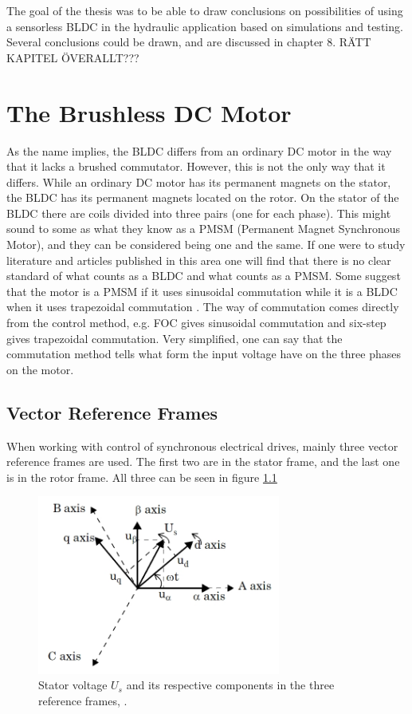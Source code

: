 \documentclass{LTHthesis}
\begin{document}
The goal of the thesis was to be able to draw conclusions on possibilities of using a sensorless BLDC in the hydraulic application based on simulations and testing. Several conclusions could be drawn, and are discussed in chapter 8.
RÄTT KAPITEL ÖVERALLT???


\chapter{The Brushless DC Motor}
As the name implies, the BLDC differs from an ordinary DC motor in the way that it lacks a brushed commutator. However, this is not the only way that it differs. 
While an ordinary DC motor has its permanent magnets on the stator, the BLDC has its permanent magnets located on the rotor. On the stator of the BLDC there are coils divided into three pairs (one for each phase). This might sound to some as what they know as a PMSM (Permanent Magnet Synchronous Motor), and they can be considered being one and the same. If one were to study literature and articles published in this area one will find that there is no clear standard of what counts as a BLDC and what counts as a PMSM. Some suggest that the motor is a PMSM if it uses sinusoidal commutation while it is a BLDC when it uses trapezoidal commutation \cite{lee_lem_keo}. The way of commutation comes directly from the control method, e.g. FOC gives sinusoidal commutation and six-step gives trapezoidal commutation. Very simplified, one can say that the commutation method tells what form the input voltage have on the three phases on the motor. 

\section{Vector Reference Frames}
When working with control of synchronous electrical drives, mainly three vector reference frames are used. The first two are in the stator frame, and the last one is in the rotor frame. All three can be seen in figure \ref{ref_frames}
\begin{figure}
\centering
\includegraphics[width=8cm]{ref_frames_mathworks}
\caption{Stator voltage $U_{s}$ and its respective components in the three reference frames, \cite{ref_frames}.}
\label{ref_frames}
\end{figure}
\end{document}
